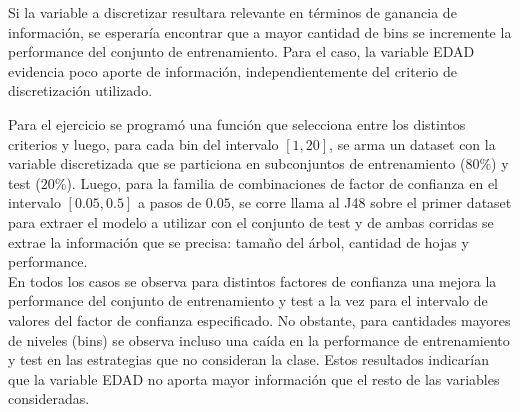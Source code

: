 \documentclass[]{article}
\begin{document}
Si la variable a discretizar resultara relevante en términos de ganancia de información, se esperaría encontrar que a mayor cantidad de bins se incremente la performance del conjunto de entrenamiento. Para el caso, la variable EDAD evidencia poco aporte de información, independientemente del criterio de discretización utilizado. 

Para el ejercicio se programó una función que selecciona entre los distintos criterios y luego, para cada bin del intervalo $[1,20]$, se arma un dataset con la variable discretizada que se particiona en subconjuntos de entrenamiento ($80\%$) y test ($20\%$). Luego, para la familia de combinaciones de factor de confianza en el intervalo $[0.05,0.5]$ a pasos de $0.05$, se corre llama al J48 sobre el primer dataset para extraer el modelo a utilizar con el conjunto de test y de ambas corridas se extrae la información que se precisa: tamaño del árbol, cantidad de hojas y performance.\\


En todos los casos se observa para distintos factores de confianza una mejora la performance del conjunto de entrenamiento y test a la vez para el intervalo de valores del factor de confianza especificado. No obstante, para cantidades mayores de niveles (bins) se observa incluso una caída en la performance de entrenamiento y test en las estrategias que no consideran la clase. Estos resultados indicarían que la variable EDAD no aporta mayor información que el resto de las variables consideradas.  
\end{document}
